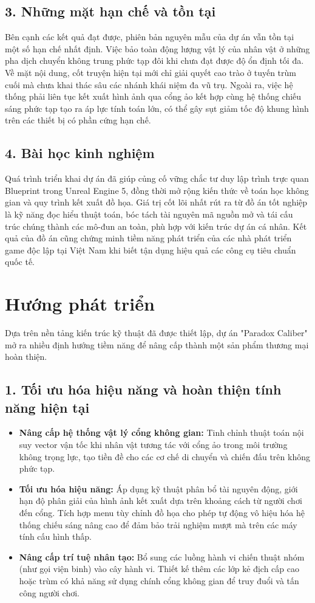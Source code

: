 \documentclass[../DoAn.tex]{subfiles}
\begin{document}
\subsection*{3. Những mặt hạn chế và tồn tại}
Bên cạnh các kết quả đạt được, phiên bản nguyên mẫu của dự án vẫn tồn tại một số hạn chế nhất định. Việc bảo toàn động lượng vật lý của nhân vật ở những pha dịch chuyển không trung phức tạp đôi khi chưa đạt được độ ổn định tối đa. Về mặt nội dung, cốt truyện hiện tại mới chỉ giải quyết cao trào ở tuyến trùm cuối mà chưa khai thác sâu các nhánh khái niệm đa vũ trụ. Ngoài ra, việc hệ thống phải liên tục kết xuất hình ảnh qua cổng ảo kết hợp cùng hệ thống chiếu sáng phức tạp tạo ra áp lực tính toán lớn, có thể gây sụt giảm tốc độ khung hình trên các thiết bị có phần cứng hạn chế.

\subsection*{4. Bài học kinh nghiệm}
Quá trình triển khai dự án đã giúp củng cố vững chắc tư duy lập trình trực quan Blueprint trong Unreal Engine 5, đồng thời mở rộng kiến thức về toán học không gian và quy trình kết xuất đồ họa. Giá trị cốt lõi nhất rút ra từ đồ án tốt nghiệp là kỹ năng đọc hiểu thuật toán, bóc tách tài nguyên mã nguồn mở và tái cấu trúc chúng thành các mô-đun an toàn, phù hợp với kiến trúc dự án cá nhân. Kết quả của đồ án cũng chứng minh tiềm năng phát triển của các nhà phát triển game độc lập tại Việt Nam khi biết tận dụng hiệu quả các công cụ tiêu chuẩn quốc tế.

\section{Hướng phát triển}

Dựa trên nền tảng kiến trúc kỹ thuật đã được thiết lập, dự án "Paradox Caliber" mở ra nhiều định hướng tiềm năng để nâng cấp thành một sản phẩm thương mại hoàn thiện.

\subsection*{1. Tối ưu hóa hiệu năng và hoàn thiện tính năng hiện tại}
\begin{itemize}
    \item \textbf{Nâng cấp hệ thống vật lý cổng không gian:} Tinh chỉnh thuật toán nội suy vector vận tốc khi nhân vật tương tác với cổng ảo trong môi trường không trọng lực, tạo tiền đề cho các cơ chế di chuyển và chiến đấu trên không phức tạp.
    \item \textbf{Tối ưu hóa hiệu năng:} Áp dụng kỹ thuật phân bổ tài nguyên động, giới hạn độ phân giải của hình ảnh kết xuất dựa trên khoảng cách từ người chơi đến cổng. Tích hợp menu tùy chỉnh đồ họa cho phép tự động vô hiệu hóa hệ thống chiếu sáng nâng cao để đảm bảo trải nghiệm mượt mà trên các máy tính cấu hình thấp.
    \item \textbf{Nâng cấp trí tuệ nhân tạo:} Bổ sung các luồng hành vi chiến thuật nhóm (như gọi viện binh) vào cây hành vi. Thiết kế thêm các lớp kẻ địch cấp cao hoặc trùm có khả năng sử dụng chính cổng không gian để truy đuổi và tấn công người chơi.
\end{itemize}
\end{document}
